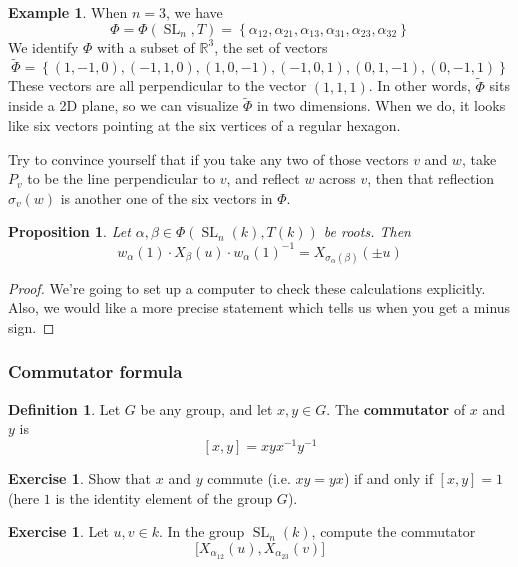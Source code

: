 \documentclass[12pt]{article}
\newtheorem{proposition}[theorem]{Proposition}
\theoremstyle{definition}
\newtheorem{definition}[theorem]{Definition}
\newtheorem{example}[theorem]{Example}
\newtheorem{exercise}[theorem]{Exercise}
\numberwithin{theorem}{subsection}
\newcommand{\R}{\mathbb{R}}
\newcommand{\sig}{\sigma}
\newcommand{\lp}{\left(}
\newcommand{\rp}{\right)}
\newcommand{\lb}{\left\{}
\newcommand{\rb}{\right\}}
\newcommand{\tbf}{\textbf}
\newcommand{\inv}{^{-1}}
\newcommand{\wt}{\widetilde}
\DeclareMathOperator{\SL}{SL}
\begin{document}
\begin{example}
When $n= 3$, we have
\[
	\Phi = \Phi(\SL_n, T) = \lb \alpha_{12}, \alpha_{21}, \alpha_{13}, \alpha_{31}, \alpha_{23}, \alpha_{32} \rb
\]
We identify $\Phi$ with a subset of $\R^3$, the set of vectors
\[
	\wt \Phi = \lb (1,-1,0), (-1,1,0), (1,0,-1), (-1,0,1), (0,1,-1), (0,-1,1) \rb
\]
These vectors are all perpendicular to the vector $(1,1,1)$. In other words, $\wt \Phi$ sits inside a 2D plane, so we can visualize $\wt \Phi$ in two dimensions. When we do, it looks like six vectors pointing at the six vertices of a regular hexagon. 

Try to convince yourself that if you take any two of those vectors $v$ and $w$, take $P_v$ to be the line perpendicular to $v$, and reflect $w$ across $v$, then that reflection $\sig_v(w)$ is another one of the six vectors in $\Phi$.
\end{example}

\begin{proposition}
Let $\alpha, \beta \in \Phi(\SL_n(k), T(k))$ be roots. Then
\[
	w_\alpha(1) \cdot X_\beta(u) \cdot w_\alpha(1) \inv = X_{\sig_\alpha (\beta)} \lp \pm u \rp
\]
\end{proposition}
\begin{proof}
We're going to set up a computer to check these calculations explicitly. Also, we would like a more precise statement which tells us when you get a minus sign.
\end{proof}

\subsubsection{Commutator formula}

\begin{definition}
Let $G$ be any group, and let $x,y \in G$. The \tbf{commutator} of $x$ and $y$ is
\[
	[x,y] = x y x \inv y \inv
\]
\end{definition}

\begin{exercise}
Show that $x$ and $y$ commute (i.e. $xy= yx$) if and only if $[x,y] = 1$ (here $1$ is the identity element of the group $G$).
\end{exercise}

\begin{exercise}
Let $u, v \in k$. In the group $\SL_n(k)$, compute the commutator
\[
	\Big[ X_{\alpha_{12}}(u), X_{\alpha_{23}}(v) \Big]
\]
\end{exercise}
\end{document}
